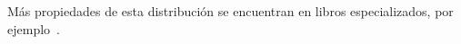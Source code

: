 %


M\'as propiedades de esta distribuci\'on se encuentran en libros especializados,
por ejemplo~\cite{FanKot90, KotBal00}.



